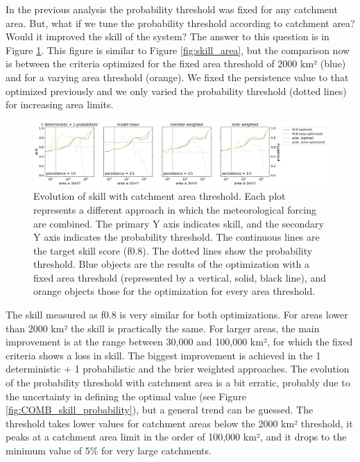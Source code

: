 \documentclass[preprint,12pt]{elsarticle}
\begin{document}
In the previous analysis the probability threshold was fixed for any catchment area. But, what if we tune the probability threshold according to catchment area? Would it improved the skill of the system? The answer to this question is in Figure \ref{fig:skill_area_probability}. This figure is similar to Figure \ref{fig:skill_area}, but the comparison now is between the criteria optimized for the fixed area threshold of 2000 km² (blue) and for a varying area threshold (orange). We fixed the persistence value to that optimized previously and we only varied the probability threshold (dotted lines) for increasing area limits.

\begin{figure}
    \centering
    \includegraphics[width=1\textwidth]{figures/skill_vs_area_varying_probability_2000km2_1239points_060h.jpg}
    \caption{Evolution of skill with catchment area threshold. Each plot represents a different approach in which the meteorological forcing are combined. The primary Y axis indicates skill, and the secondary Y axis indicates the probability threshold. The continuous lines are the target skill score (f0.8). The dotted lines show the probability threshold. Blue objects are the results of the optimization with a fixed area threshold (represented by a vertical, solid, black line), and orange objects those for the optimization for every area threshold.}
    \label{fig:skill_area_probability}
\end{figure}

The skill measured as f0.8 is very similar for both optimizations. For areas lower than 2000 km² the skill is practically the same. For larger areas, the main improvement is at the range between 30,000 and 100,000 km², for which the fixed criteria shows a loss in skill. The biggest improvement is achieved in the 1 deterministic + 1 probabilistic and the  brier weighted approaches. The evolution of the probability threshold with catchment area is a bit erratic, probably due to the uncertainty in defining the optimal value (see Figure \ref{fig:COMB_skill_probability}), but a general trend can be guessed. The threshold takes lower values for catchment areas below the 2000 km² threshold, it peaks at a catchment area limit in the order of 100,000 km², and it drops to the minimum value of 5\% for very large catchments.
\end{document}
